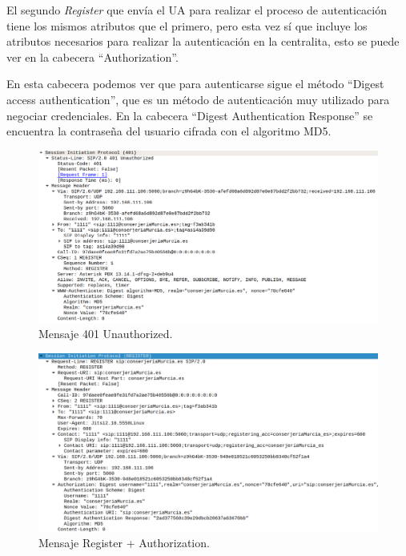 \documentclass[a4paper]{article}
\begin{document}
 El segundo \textit{Register} que envía el UA para realizar el proceso de autenticación tiene los mismos atributos que el primero, pero esta vez sí que incluye los atributos necesarios para realizar la autenticación en la centralita, esto se puede ver en la cabecera ``Authorization''.

 En esta cabecera podemos ver que para autenticarse sigue el método ``Digest access authentication'', que es un método de autenticación muy utilizado para negociar credenciales. En la cabecera ``Digest Authentication Response'' se encuentra la contraseña del usuario cifrada con el algoritmo MD5.

\begin{figure}
    \begin{center}
        \includegraphics[width=1\textwidth]{401.png}
         \caption{Mensaje 401 Unauthorized.}
         \label{fig:401-2}
    \end{center}
\end{figure}
\begin{figure}
    \begin{center}
        \includegraphics[width=1\textwidth]{register2.png}
         \caption{Mensaje Register + Authorization.}
         \label{fig:reg2}
    \end{center}
\end{figure}
\end{document}

